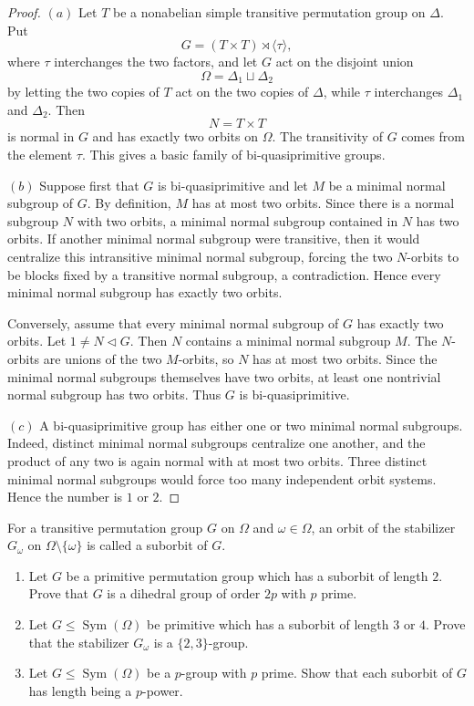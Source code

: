 \begin{proof}
\((a)\) Let \(T\) be a nonabelian simple transitive permutation group on
\(\Delta\). Put
\[
    G=(T\times T)\rtimes \langle \tau\rangle,
\]
where \(\tau\) interchanges the two factors, and let \(G\) act on the disjoint
union
\[
    \Omega=\Delta_1\sqcup \Delta_2
\]
by letting the two copies of \(T\) act on the two copies of \(\Delta\), while
\(\tau\) interchanges \(\Delta_1\) and \(\Delta_2\). Then
\[
    N=T\times T
\]
is normal in \(G\) and has exactly two orbits on \(\Omega\). The transitivity of
\(G\) comes from the element \(\tau\). This gives a basic family of
bi-quasiprimitive groups.

\((b)\) Suppose first that \(G\) is bi-quasiprimitive and let \(M\) be a minimal
normal subgroup of \(G\). By definition, \(M\) has at most two orbits. Since
there is a normal subgroup \(N\) with two orbits, a minimal normal subgroup
contained in \(N\) has two orbits. If another minimal normal subgroup were
transitive, then it would centralize this intransitive minimal normal subgroup,
forcing the two \(N\)-orbits to be blocks fixed by a transitive normal subgroup,
a contradiction. Hence every minimal normal subgroup has exactly two orbits.

Conversely, assume that every minimal normal subgroup of \(G\) has exactly two
orbits. Let \(1\neq N\lhd G\). Then \(N\) contains a minimal normal subgroup
\(M\). The \(N\)-orbits are unions of the two \(M\)-orbits, so \(N\) has at most
two orbits. Since the minimal normal subgroups themselves have two orbits, at
least one nontrivial normal subgroup has two orbits. Thus \(G\) is
bi-quasiprimitive.

\((c)\) A bi-quasiprimitive group has either one or two minimal normal
subgroups. Indeed, distinct minimal normal subgroups centralize one another,
and the product of any two is again normal with at most two orbits. Three
distinct minimal normal subgroups would force too many independent orbit
systems. Hence the number is \(1\) or \(2\).
\end{proof}

\begin{exercise}
For a transitive permutation group \(G\) on \(\Omega\) and \(\omega \in \Omega\),
an orbit of the stabilizer \(G_\omega\) on \(\Omega \setminus \{\omega\}\) is
called a suborbit of \(G\).
\begin{enumerate}[label=(\alph*)]
    \item Let \(G\) be a primitive permutation group which has a suborbit of
    length \(2\). Prove that \(G\) is a dihedral group of order \(2p\) with
    \(p\) prime.
    \item Let \(G \leq \operatorname{Sym}(\Omega)\) be primitive which has a
    suborbit of length \(3\) or \(4\). Prove that the stabilizer \(G_\omega\) is
    a \(\{2,3\}\)-group.
    \item Let \(G \leq \operatorname{Sym}(\Omega)\) be a \(p\)-group with
    \(p\) prime. Show that each suborbit of \(G\) has length being a
    \(p\)-power.
\end{enumerate}
\end{exercise}

